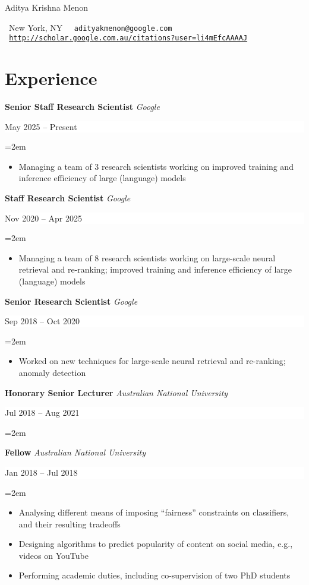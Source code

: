 \documentclass{article}
\newcommand{\MyName}[1]{ %
    \LARGE \usefont{OT1}{phv}{b}{n}
    \begin{center}
        #1
    \end{center}
    \normalsize \normalfont}
\newcommand{\NewPart}[1]{\section*{#1}}
\newcommand{\EducationEntry}[4]{
    \noindent \textbf{#1}
    \textit{#3}
    \hfill      %
    \colorbox{White}{
      \parbox{9em}{
      \hfill\color{Black}#2}} \par  %
    \noindent\hangindent=2em\hangafter=0 \small #4 %
    \normalsize \par}
\newcommand{\WorkEntry}[4]{       %
    \noindent
    \textbf{#1}
    \textit{#3} %
    \hfill      %
    \colorbox{White}{%
      \parbox{9em}{%
      \hfill\color{Black}#2}} \par   %
    \noindent\hangindent=2em\hangafter=0 \small #4 %
    \normalsize \par}
\begin{document}
    
\MyName{Aditya Krishna Menon}
{\par
\begin{center}
    {\small{\small\faMapMarker}\ New York, NY}
    $\ $
    {\small\tt{\small\Letter}\ adityakmenon@google.com}
    $\ $
    {\footnotesize\tt{\footnotesize\faGraduationCap}\ \url{http://scholar.google.com.au/citations?user=li4mEfcAAAAJ}}
\end{center}
\par}



\NewPart{Experience}{}

\WorkEntry
{Senior Staff Research Scientist}
{May 2025 -- Present}
{Google}%
{%
\begin{itemize} \itemsep -4pt
    \item Managing a team of $3$ research scientists working on improved training and inference efficiency of large (language) models
\end{itemize}
}
\WorkEntry
{Staff Research Scientist}
{Nov 2020 -- Apr 2025}
{Google}%
{%
\begin{itemize} \itemsep -4pt
    \item Managing a team of $8$ research scientists working on large-scale neural retrieval and re-ranking; improved training and inference efficiency of large (language) models
\end{itemize}
}
\WorkEntry
{Senior Research Scientist}
{Sep 2018 -- Oct 2020}
{Google}
{%
\begin{itemize} \itemsep -4pt
    \item Worked on new techniques for large-scale neural retrieval and re-ranking; anomaly detection
\end{itemize}
}

\WorkEntry
{Honorary Senior Lecturer}
{Jul 2018 -- Aug 2021}
{Australian National University}{\vspace{-\baselineskip}}
\WorkEntry
{Fellow}
{Jan 2018 -- Jul 2018}
{Australian National University}
{%
\begin{itemize} \itemsep -1pt
    \item Analysing different means of imposing ``fairness'' constraints on classifiers, and their resulting tradeoffs 

    \item Designing algorithms to predict popularity of content on social media, e.g., videos on YouTube

    \item Performing academic duties, including co-supervision of two PhD students
\end{itemize}
}
\end{document}
